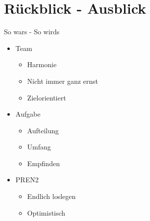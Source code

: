\section{Rückblick - Ausblick} %
\begin{frame}
	\begin{block}{So wars - So wirds}
		\begin{itemize}
			\item Team
			\begin{itemize}
				\item Harmonie
				\item Nicht immer ganz ernst
				\item Zielorientiert
			\end{itemize}
			\item Aufgabe
			\begin{itemize}
				\item Aufteilung
				\item Umfang
				\item Empfinden
			\end{itemize}
			\item PREN2
			\begin{itemize}
				\item Endlich loslegen 
				\item Optimistisch
			\end{itemize}
		\end{itemize}
	\end{block}
\end{frame}
